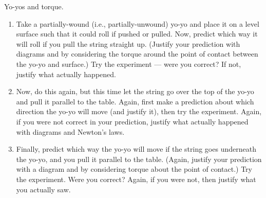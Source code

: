 \newpage
\begin{aproblem}{Yo-yos and torque.}
  \begin{enumerate}
  \item Take a partially-wound (i.e., partially-unwound) yo-yo and
    place it on a level surface such that it could roll if pushed or
    pulled.  Now, predict which way it will roll if you pull the
    string straight up.  (Justify your prediction with diagrams and by
    considering the torque around the point of contact between the
    yo-yo and surface.)  Try the experiment --- were you correct?  If
    not, justify what actually happened.

  \item Now, do this again, but this time let the string go over the
    top of the yo-yo and pull it parallel to the table.  Again, first
    make a prediction about which direction the yo-yo will move (and
    justify it), then try the experiment.  Again, if you were not
    correct in your prediction, justify what actually happened with
    diagrams and Newton's laws.

  \item Finally, predict which way the yo-yo will move if the string
    goes underneath the yo-yo, and you pull it parallel to the table.
    (Again, justify your prediction with a diagram and by considering
    torque about the point of contact.)  Try the experiment.  Were you
    correct?  Again, if you were not, then justify what you actually
    saw.
  \end{enumerate}
\end{aproblem}

